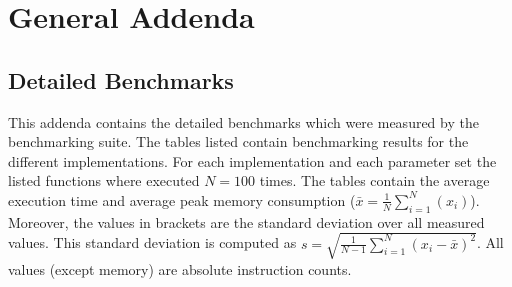 \chapter{General Addenda}

\section{Detailed Benchmarks}
\label{app:detailed_benchmarks}
This addenda contains the detailed benchmarks which were measured by the benchmarking suite. The tables listed contain benchmarking results for the different implementations. For each implementation and each parameter set the listed functions where executed $N=100$ times. The tables contain the average execution time and average peak memory consumption ($\bar{x}=\frac{1}{N}\sum_{i=1}^N{(x_i)}$). Moreover, the values in brackets are the standard deviation over all measured values. This standard deviation is computed as $s=\sqrt{\frac{1}{N-1}\sum_{i=1}^N(x_i-\bar{x})^2}$. All values (except memory)  are absolute instruction counts.\newpage

